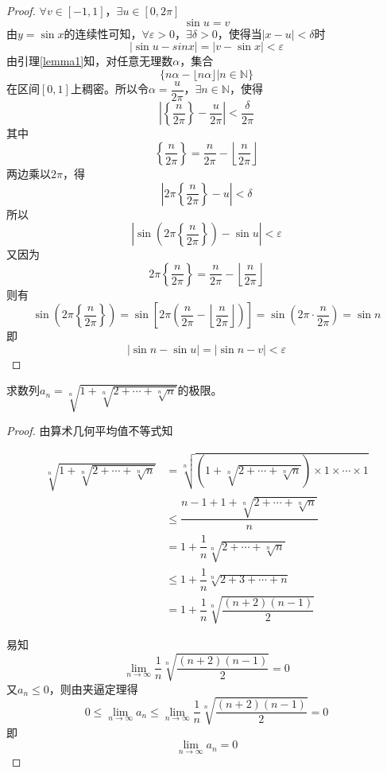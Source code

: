\begin{proof}

    $\forall v \in [-1, 1]$，$\exists u \in [0, 2\pi]$
    $$\sin u = v$$
    由$y = \sin x$的连续性可知，$\forall \varepsilon > 0$，$\exists \delta > 0$，使得当$|x - u| < \delta$时
    $$| \sin u - sin x | = | v - \sin x | < \varepsilon$$
    由引理\ref{lemma1}知，对任意无理数$\alpha$，集合
    $$\{n\alpha - \lfloor n\alpha \rfloor \big| n \in \mathbb{N}\}$$
    在区间$[0, 1]$上稠密。所以令$\alpha = \dfrac{u}{2\pi}$，$\exists n \in \mathbb{N}$，使得
    $$\left| \left \{\dfrac{n}{2\pi} \right\} - \dfrac{u}{2\pi} \right| < \dfrac{\delta}{2\pi}$$
    其中
    $$\left \{\dfrac{n}{2\pi} \right\} = \dfrac{n}{2\pi} - \left\lfloor \dfrac{n}{2\pi} \right\rfloor$$
    两边乘以$2\pi$，得
    $$\left|  2\pi \left \{\dfrac{n}{2\pi} \right\} - u \right| < \delta$$
    所以
    $$\left| \sin{\left(2\pi \left \{\dfrac{n}{2\pi} \right\} \right)} - \sin u \right| < \varepsilon$$
    又因为
    $$2\pi \left \{\dfrac{n}{2\pi} \right\} = \dfrac{n}{2\pi} - \left\lfloor \dfrac{n}{2\pi} \right\rfloor$$
    则有
    $$\sin{\left(2\pi \left \{\dfrac{n}{2\pi} \right\} \right)} = \sin\left[2\pi \left( \dfrac{n}{2\pi} - \left\lfloor \dfrac{n}{2\pi} \right\rfloor \right)\right] = \sin\left(2\pi \cdot \dfrac{n}{2\pi}\right) = \sin n$$
    即
    $$|\sin n - \sin u| = |\sin n - v| < \varepsilon$$

\end{proof}

\begin{proposition}

    求数列$a_n = \sqrt[n]{1 + \sqrt[n]{2 + \cdots + \sqrt[n]{n}}}$的极限。

\end{proposition}

\begin{proof}

    由算术几何平均值不等式知

    \begin{align*}
        \sqrt[n]{1 + \sqrt[n]{2 + \cdots + \sqrt[n]{n}}} & = \sqrt[n]{\left(1 + \sqrt[n]{2 + \cdots + \sqrt[n]{n}}\right) \times 1 \times \cdots \times 1} \\
        & \leq \dfrac{n - 1 + 1 + \sqrt[n]{2 + \cdots + \sqrt[n]{n}}}{n} \\
        & = 1 + \dfrac{1}{n} \sqrt[n]{2 + \cdots + \sqrt[n]{n}} \\
        & \leq 1 + \dfrac{1}{n} \sqrt[n]{2 + 3 + \cdots + n} \\
        & = 1 + \dfrac{1}{n} \sqrt[n]{\dfrac{(n + 2)(n - 1)}{2}}
    \end{align*}

    易知
    $$\lim\limits_{n\to\infty}{\dfrac{1}{n} \sqrt[n]{\dfrac{(n + 2)(n - 1)}{2}}} = 0$$
    又$a_n \leq 0$，则由夹逼定理得
    $$0 \leq \lim\limits_{n\to\infty}{a_n} \leq \lim\limits_{n\to\infty}{\dfrac{1}{n} \sqrt[n]{\dfrac{(n + 2)(n - 1)}{2}}} = 0$$
    即
    $$\lim\limits_{n\to\infty}{a_n} = 0$$
    
\end{proof}

